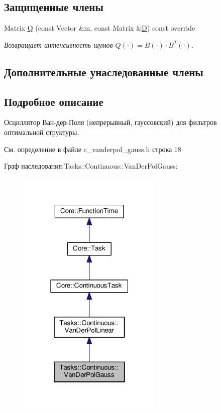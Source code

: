 \subsection*{Защищенные члены}
\begin{DoxyCompactItemize}
\item 
Matrix \hyperlink{class_tasks_1_1_continuous_1_1_van_der_pol_gauss_aefe0f9432c2c283fba65ca73e6092f28}{Q} (const Vector \&m, const Matrix \&\hyperlink{class_tasks_1_1_continuous_1_1_van_der_pol_linear_a07e8842a175006f214238a9f71e5ebdf}{D}) const override\hypertarget{class_tasks_1_1_continuous_1_1_van_der_pol_gauss_aefe0f9432c2c283fba65ca73e6092f28}{}\label{class_tasks_1_1_continuous_1_1_van_der_pol_gauss_aefe0f9432c2c283fba65ca73e6092f28}

\begin{DoxyCompactList}\small\item\em Возвращает интенсивность шумов $Q(\cdot) = B(\cdot) \cdot B^T(\cdot)$. \end{DoxyCompactList}\end{DoxyCompactItemize}
\subsection*{Дополнительные унаследованные члены}


\subsection{Подробное описание}
Осциллятор Ван-\/дер-\/Поля (непрерывный, гауссовский) для фильтров оптимальной структуры. 

См. определение в файле c\+\_\+vanderpol\+\_\+gauss.\+h строка 18



Граф наследования\+:Tasks\+:\+:Continuous\+:\+:Van\+Der\+Pol\+Gauss\+:
\nopagebreak
\begin{figure}[H]
\begin{center}
\leavevmode
\includegraphics[width=195pt]{class_tasks_1_1_continuous_1_1_van_der_pol_gauss__inherit__graph}
\end{center}
\end{figure}


